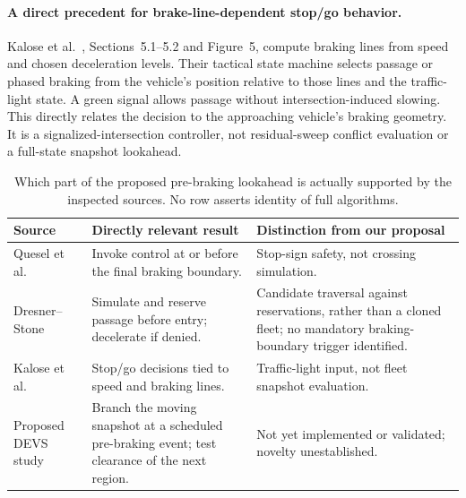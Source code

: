 \documentclass[11pt,a4paper]{article}
\theoremstyle{remark}
\newcounter{algorithm}
\begin{document}
\paragraph{A direct precedent for brake-line-dependent stop/go behavior.}
Kalose et al.~\cite{kalose2024}, Sections~5.1--5.2 and Figure~5,
compute braking lines from speed and chosen deceleration levels. Their
tactical state machine selects passage or phased braking from the vehicle's
position relative to those lines and the traffic-light state. A green signal
allows passage without intersection-induced slowing. This directly relates
the decision to the approaching vehicle's braking geometry. It is a
signalized-intersection controller, not residual-sweep conflict evaluation
or a full-state snapshot lookahead.

\begin{table}[htbp]
\centering\small
\caption{Which part of the proposed pre-braking lookahead is actually
supported by the inspected sources. No row asserts identity of full algorithms.}
\label{tab:prebraking-review}
\begin{tabular}{p{.24\linewidth}p{.33\linewidth}p{.34\linewidth}}
\toprule
Source & Directly relevant result & Distinction from our proposal\\\midrule
Quesel et al.~\cite{quesel2016} & Invoke control at or before the final braking boundary.
& Stop-sign safety, not crossing simulation.\\[4pt]
Dresner--Stone~\cite{dresner2008} & Simulate and reserve passage before entry; decelerate if denied.
& Candidate traversal against reservations, rather than a cloned fleet; no mandatory braking-boundary trigger identified.\\[4pt]
Kalose et al.~\cite{kalose2024} & Stop/go decisions tied to speed and braking lines.
& Traffic-light input, not fleet snapshot evaluation.\\[4pt]
Proposed DEVS study & Branch the moving snapshot at a scheduled pre-braking event; test clearance of the next region.
& Not yet implemented or validated; novelty unestablished.\\
\bottomrule
\end{tabular}
\end{table}
\end{document}
